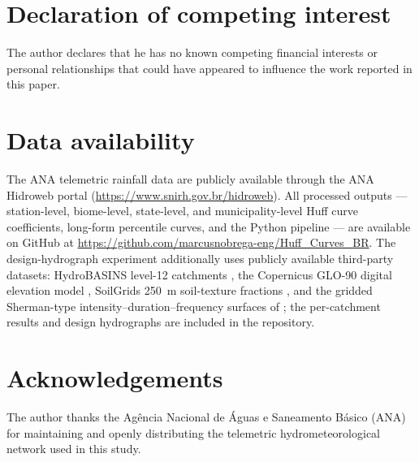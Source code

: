 \documentclass[a4paper,fleqn]{cas-sc}
\begin{document}
\section*{Declaration of competing interest}

The author declares that he has no known competing financial interests
or personal relationships that could have appeared to influence the
work reported in this paper.

\section*{Data availability}

The ANA telemetric rainfall data are publicly available through the
ANA Hidroweb portal (\url{https://www.snirh.gov.br/hidroweb}).
All processed outputs — station-level, biome-level, state-level, and
municipality-level Huff curve coefficients, long-form percentile
curves, and the Python pipeline — are available on GitHub at
\url{https://github.com/marcusnobrega-eng/Huff_Curves_BR}.
The design-hydrograph experiment additionally uses publicly available
third-party datasets: HydroBASINS level-12 catchments
\citep{Lehner2013}, the Copernicus GLO-90 digital elevation model
\citep{CopernicusDEM}, SoilGrids 250~m soil-texture fractions
\citep{Poggio2021}, and the gridded Sherman-type intensity–duration–frequency surfaces of
\citet{GomesJuniorIDF}; the per-catchment results and design
hydrographs are included in the repository.

\section*{Acknowledgements}

The author thanks the Agência Nacional de Águas e Saneamento Básico
(ANA) for maintaining and openly distributing the telemetric
hydrometeorological network used in this study.

\end{document}
